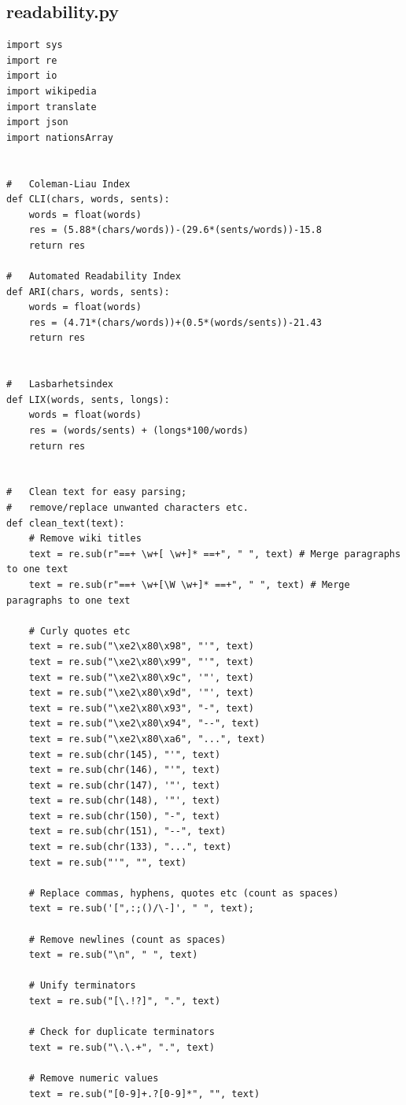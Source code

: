 \documentclass[a4paper]{article}
\begin{document}
\subsection{readability.py}
\begin{verbatim}
import sys
import re
import io
import wikipedia
import translate
import json
import nationsArray


#   Coleman-Liau Index
def CLI(chars, words, sents):
    words = float(words)
    res = (5.88*(chars/words))-(29.6*(sents/words))-15.8 
    return res    
  
#   Automated Readability Index 
def ARI(chars, words, sents):
    words = float(words)
    res = (4.71*(chars/words))+(0.5*(words/sents))-21.43  
    return res
    
    
#   Lasbarhetsindex
def LIX(words, sents, longs):
    words = float(words)
    res = (words/sents) + (longs*100/words)
    return res
    

#   Clean text for easy parsing;
#   remove/replace unwanted characters etc.
def clean_text(text):
    # Remove wiki titles
    text = re.sub(r"==+ \w+[ \w+]* ==+", " ", text) # Merge paragraphs to one text
    text = re.sub(r"==+ \w+[\W \w+]* ==+", " ", text) # Merge paragraphs to one text

    # Curly quotes etc
    text = re.sub("\xe2\x80\x98", "'", text)
    text = re.sub("\xe2\x80\x99", "'", text)
    text = re.sub("\xe2\x80\x9c", '"', text)
    text = re.sub("\xe2\x80\x9d", '"', text)
    text = re.sub("\xe2\x80\x93", "-", text)
    text = re.sub("\xe2\x80\x94", "--", text)
    text = re.sub("\xe2\x80\xa6", "...", text) 
    text = re.sub(chr(145), "'", text)
    text = re.sub(chr(146), "'", text)
    text = re.sub(chr(147), '"', text)
    text = re.sub(chr(148), '"', text)
    text = re.sub(chr(150), "-", text)
    text = re.sub(chr(151), "--", text)
    text = re.sub(chr(133), "...", text)
    text = re.sub("'", "", text)
    
    # Replace commas, hyphens, quotes etc (count as spaces)
    text = re.sub('[",:;()/\-]', " ", text);
    
    # Remove newlines (count as spaces)
    text = re.sub("\n", " ", text)
    
    # Unify terminators
    text = re.sub("[\.!?]", ".", text)
    
    # Check for duplicate terminators
    text = re.sub("\.\.+", ".", text)
    
    # Remove numeric values
    text = re.sub("[0-9]+.?[0-9]*", "", text)
    

\end{verbatim}
\end{document}
